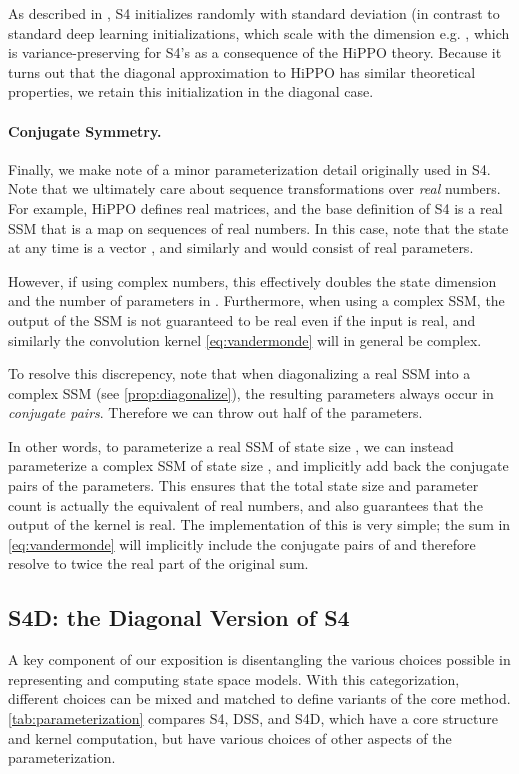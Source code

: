 \documentclass{article}
\newcommand{\para}[1]{\paragraph{#1}}
\begin{document}
As described in \citep{gu2022hippo}, S4 initializes  randomly with standard deviation  (in contrast to standard deep learning initializations, which scale with the dimension e.g. , which is variance-preserving for S4's  as a consequence of the HiPPO theory.
Because it turns out that the diagonal approximation to HiPPO has similar theoretical properties, we retain this initialization in the diagonal case.

\para{Conjugate Symmetry.}
Finally, we make note of a minor parameterization detail originally used in S4.
Note that we ultimately care about sequence transformations over \emph{real} numbers.
For example, HiPPO defines real  matrices, and the base definition of S4 is a real SSM that is a map on sequences of real numbers.
In this case, note that the state  at any time is a vector , and similarly  and  would consist of  real parameters.

However, if using complex numbers, this effectively doubles the state dimension and the number of parameters in .
Furthermore, when using a complex SSM, the output of the SSM is not guaranteed to be real even if the input is real, and similarly the convolution kernel \eqref{eq:vandermonde} will in general be complex.

To resolve this discrepency, note that when diagonalizing a real SSM into a complex SSM (see \cref{prop:diagonalize}),
the resulting parameters always occur in \emph{conjugate pairs}.
Therefore we can throw out half of the parameters.

In other words, to parameterize a real SSM of state size , we can instead parameterize a complex SSM of state size , and implicitly add back the conjugate pairs of the parameters. This ensures that the total state size and parameter count is actually the equivalent of  real numbers, and also guarantees that the output of the kernel is real.
The implementation of this is very simple; the sum in \eqref{eq:vandermonde} will implicitly include the conjugate pairs of  and therefore resolve to twice the real part of the original sum.







\subsection{S4D: the Diagonal Version of S4}
\label{sec:s4d}

A key component of our exposition is disentangling the various choices possible in representing and computing state space models.
With this categorization, different choices can be mixed and matched to define variants of the core method.
\cref{tab:parameterization} compares S4, DSS, and S4D, which have a core structure and kernel computation, but have various choices of other aspects of the parameterization.
\end{document}
